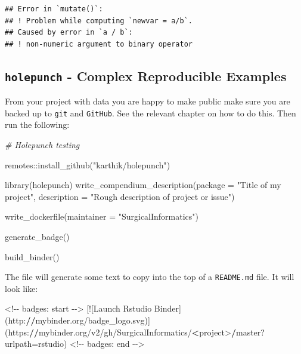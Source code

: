 \documentclass[
]{book}
\newenvironment{Shaded}{\begin{snugshade}}{\end{snugshade}}
\newcommand{\AttributeTok}[1]{\textcolor[rgb]{0.77,0.63,0.00}{#1}}
\newcommand{\CommentTok}[1]{\textcolor[rgb]{0.56,0.35,0.01}{\textit{#1}}}
\newcommand{\ErrorTok}[1]{\textcolor[rgb]{0.64,0.00,0.00}{\textbf{#1}}}
\newcommand{\FunctionTok}[1]{\textcolor[rgb]{0.00,0.00,0.00}{#1}}
\newcommand{\NormalTok}[1]{#1}
\newcommand{\OtherTok}[1]{\textcolor[rgb]{0.56,0.35,0.01}{#1}}
\newcommand{\SpecialCharTok}[1]{\textcolor[rgb]{0.00,0.00,0.00}{#1}}
\newcommand{\StringTok}[1]{\textcolor[rgb]{0.31,0.60,0.02}{#1}}
\begin{document}
\begin{verbatim}
## Error in `mutate()`:
## ! Problem while computing `newvar = a/b`.
## Caused by error in `a / b`:
## ! non-numeric argument to binary operator
\end{verbatim}

\hypertarget{holepunch---complex-reproducible-examples}{%
\subsection{\texorpdfstring{\texttt{holepunch} - Complex Reproducible Examples}{holepunch - Complex Reproducible Examples}}\label{holepunch---complex-reproducible-examples}}

From your project with data you are happy to make public make sure you are backed up to \texttt{git} and \texttt{GitHub}. See the relevant chapter on how to do this. Then run the following:

\begin{Shaded}
\begin{Highlighting}[]
\CommentTok{\# Holepunch testing}

\NormalTok{remotes}\SpecialCharTok{::}\FunctionTok{install\_github}\NormalTok{(}\StringTok{"karthik/holepunch"}\NormalTok{)}

\FunctionTok{library}\NormalTok{(holepunch)}
\FunctionTok{write\_compendium\_description}\NormalTok{(}\AttributeTok{package =} \StringTok{"Title of my project"}\NormalTok{, }
                             \AttributeTok{description =} \StringTok{"Rough description of project or issue"}\NormalTok{)}

\FunctionTok{write\_dockerfile}\NormalTok{(}\AttributeTok{maintainer =} \StringTok{"SurgicalInformatics"}\NormalTok{)}

\FunctionTok{generate\_badge}\NormalTok{()}

\FunctionTok{build\_binder}\NormalTok{()}
\end{Highlighting}
\end{Shaded}

The file will generate some text to copy into the top of a \texttt{README.md} file. It will look like:

\begin{Shaded}
\begin{Highlighting}[]
\SpecialCharTok{\textless{}!{-}{-}}\NormalTok{ badges}\SpecialCharTok{:}\NormalTok{ start }\SpecialCharTok{{-}}\OtherTok{{-}\textgreater{}}
\NormalTok{[}\SpecialCharTok{!}\NormalTok{[Launch Rstudio Binder](http}\SpecialCharTok{:}\ErrorTok{//}\NormalTok{mybinder.org}\SpecialCharTok{/}\NormalTok{badge\_logo.svg)](https}\SpecialCharTok{:}\ErrorTok{//}\NormalTok{mybinder.org}\SpecialCharTok{/}\NormalTok{v2}\SpecialCharTok{/}\NormalTok{gh}\SpecialCharTok{/}\NormalTok{SurgicalInformatics}\SpecialCharTok{/}\ErrorTok{\textless{}}\NormalTok{project}\SpecialCharTok{\textgreater{}}\ErrorTok{/}\NormalTok{master?}\AttributeTok{urlpath=}\NormalTok{rstudio)}
\SpecialCharTok{\textless{}!{-}{-}}\NormalTok{ badges}\SpecialCharTok{:}\NormalTok{ end }\SpecialCharTok{{-}}\OtherTok{{-}\textgreater{}}
\end{Highlighting}
\end{Shaded}
\end{document}
